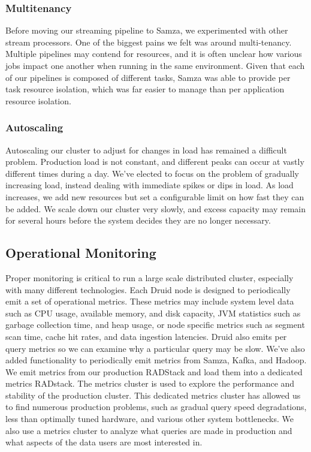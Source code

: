 \documentclass{vldb}
\begin{document}
\subsubsection{Multitenancy}
Before moving our streaming pipeline to Samza, we experimented with other
stream processors. One of the biggest pains we felt was around multi-tenancy. Multiple
pipelines may contend for resources, and it is often unclear how various jobs
impact one another when running in the same environment. Given that each of our
pipelines is composed of different tasks, Samza was able to provide per task
resource isolation, which was far easier to manage than per application
resource isolation.

\subsubsection{Autoscaling}
Autoscaling our cluster to adjust for changes in load has remained a difficult
problem. Production load is not constant, and different peaks can occur at
vastly different times during a day. We’ve elected to focus on the problem of
gradually increasing load, instead dealing with immediate spikes or dips in
load. As load increases, we add new resources but set a configurable limit on
how fast they can be added. We scale down our cluster very slowly, and excess
capacity may remain for several hours before the system decides they are no
longer necessary.

\subsection{Operational Monitoring}
Proper monitoring is critical to run a large scale distributed cluster,
especially with many different technologies. Each Druid node is designed to
periodically emit a set of operational metrics. These metrics may include
system level data such as CPU usage, available memory, and disk capacity, JVM
statistics such as garbage collection time, and heap usage, or node specific
metrics such as segment scan time, cache hit rates, and data ingestion
latencies. Druid also emits per query metrics so we can examine why a
particular query may be slow. We’ve also added functionality to periodically
emit metrics from Samza, Kafka, and Hadoop. We emit metrics from our production
RADStack and load them into a dedicated metrics RADstack. The metrics cluster
is used to explore the performance and stability of the production cluster.
This dedicated metrics cluster has allowed us to find numerous production
problems, such as gradual query speed degradations, less than optimally tuned
hardware, and various other system bottlenecks. We also use a metrics cluster
to analyze what queries are made in production and what aspects of the data
users are most interested in.
\end{document}
